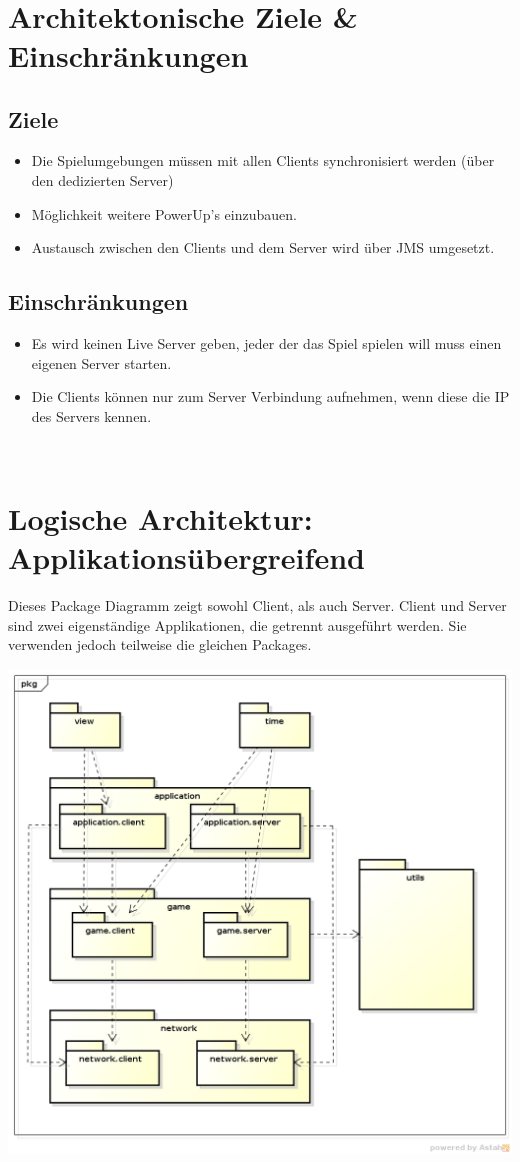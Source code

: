\documentclass[11pt]{scrartcl}
\begin{document}
 
\section{Architektonische Ziele \& Einschränkungen}
\subsection{Ziele}
\begin{itemize}
    \item Die Spielumgebungen müssen mit allen Clients synchronisiert werden (über den dedizierten Server)
    \item Möglichkeit weitere PowerUp's einzubauen.
    \item Austausch zwischen den Clients und dem Server wird über JMS umgesetzt.
\end{itemize}


\subsection{Einschränkungen}
\begin{itemize}
    \item Es wird keinen Live Server geben, jeder der das Spiel spielen will muss einen eigenen Server starten.
    \item Die Clients können nur zum Server Verbindung aufnehmen, wenn diese die IP des Servers kennen.
\end{itemize}


\newpage
 
\section{Logische Architektur: Applikationsübergreifend}
Dieses Package Diagramm zeigt sowohl Client, als auch Server. Client und Server sind zwei eigenständige Applikationen, die getrennt ausgeführt werden. Sie verwenden jedoch teilweise die gleichen Packages.

\includegraphics[scale=0.5]{LogischeSicht}
\end{document}
